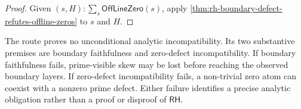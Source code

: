 \begin{proof}
Given $(s,H):\sum_s\mathsf{OffLineZero}(s)$, apply
\autoref{thm:rh-boundary-defect-refutes-offline-zeros} to $s$ and $H$.
\end{proof}

\begin{principle}
\label{prin:rh-boundary-defect-route-scope}
The route proves no unconditional analytic incompatibility. Its two
substantive premises are boundary faithfulness and zero-defect
incompatibility. If boundary faithfulness fails, prime-visible skew may be
lost before reaching the observed boundary layers. If zero-defect
incompatibility fails, a non-trivial zero atom can coexist with a nonzero
prime defect. Either failure identifies a precise analytic obligation rather
than a proof or disproof of $\mathsf{RH}$.
\end{principle}

